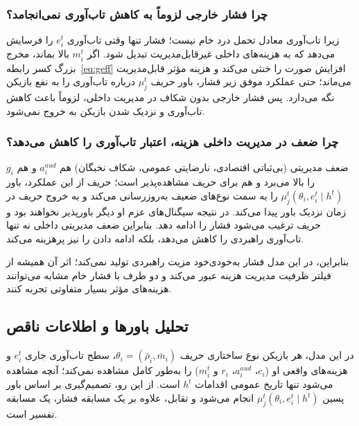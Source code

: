 \documentclass[12pt]{article}
\begin{document}
\subsubsection*{چرا فشار خارجی لزوماً به کاهش تاب‌آوری نمی‌انجامد؟}
        زیرا تاب‌آوری معادل تحمل درد خام نیست؛ فشار تنها وقتی تاب‌آوری 
        $e_i^t$
    را فرسایش می‌دهد که
    به هزینه‌های داخلی غیرقابل‌مدیریت تبدیل شود. اگر 
    $m_i^t$ 
    بالا بماند، مخرج بزرگ کسر رابطه~\eqref{eq:geff} 
    افزایش صورت را خنثی می‌کند و هزینه مؤثر قابل‌مدیریت می‌ماند؛
    حتی عملکرد موفق زیر فشار، باور حریف 
    $\mu_j^t$
    درباره تاب‌آوری را به نفع بازیکن نگه می‌دارد. 
    پس فشار خارجی بدون شکاف در مدیریت داخلی،
        لزوماً
        باعث کاهش تاب‌آوری و 
        نزدیک شدن بازیکن به خروج
        نمی‌شود.
        
\subsubsection*{چرا ضعف در مدیریت داخلی هزینه، اعتبار تاب‌آوری را کاهش می‌دهد؟}
    ضعف مدیریتی 
    (بی‌ثباتی اقتصادی، نارضایتی عمومی، شکاف نخبگان)
    هم $a_i^{aud}$ و هم $g_i$ 
    را بالا می‌برد و هم برای حریف مشاهده‌پذیر
    است؛ حریف از این عملکرد، باور 
    $\mu_j^t(\theta_i,e_i^t \mid h^t)$
    را به سمت نوع‌های ضعیف به‌روزرسانی می‌کند
    و به خروج حریف در زمان نزدیک باور پیدا می‌کند.
     در نتیجه 
    سیگنال‌های عزم او دیگر باورپذیر نخواهند بود و حریف
    ترغیب می‌شود فشار را ادامه دهد.
     بنابراین ضعف
 مدیریتی داخلی نه تنها 
 تاب‌آوری راهبردی را کاهش می‌دهد، بلکه ادامه دادن را نیز پرهزینه می‌کند.

\vspace{0.7cm}

بنابراین، در این مدل
 فشار به‌خودی‌خود مزیت راهبردی تولید نمی‌کند؛ اثر آن همیشه از
 فیلتر ظرفیت مدیریت هزینه عبور می‌کند و دو طرف با فشار خام
 مشابه می‌توانند هزینه‌های مؤثر بسیار متفاوتی تجربه کنند.

\subsection{تحلیل باورها و اطلاعات ناقص}

در این مدل، هر بازیکن نوع ساختاری حریف 
$\theta_i = (\bar{\rho}_i, \bar{m}_i)$،
 سطح تاب‌آوری جاری $e_i^t$
  و هزینه‌های واقعی او ($c_i$، $a_i^{aud}$، $r_i$ و $m_i^t$)
   را به‌طور کامل 
   مشاهده نمی‌کند؛ آنچه مشاهده می‌شود تنها تاریخ عمومی اقدامات $h^t$
    است. از این رو، تصمیم‌گیری بر اساس باور پسین 
    $\mu_j^t(\theta_i, e_i^t \mid h^t)$
     انجام می‌شود و تقابل، علاوه بر یک مسابقه فشار، یک مسابقه تفسیر است.
\end{document}
